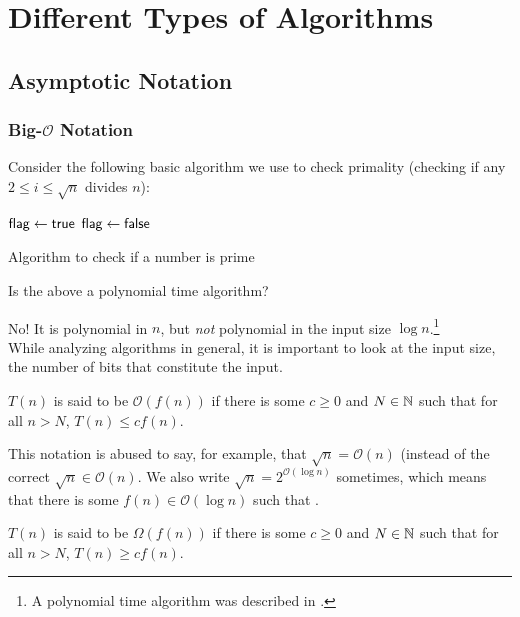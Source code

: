 \section{Different Types of Algorithms}

\subsection{Asymptotic Notation}

\subsubsection{Big-\texorpdfstring{$\mathcal{O}$}{} Notation}

Consider the following basic algorithm we use to check primality (checking if any $2\leq i\leq \sqrt{n}$ divides $n$):

\begin{algorithm}
	\DontPrintSemicolon
	$\mathsf{flag}\gets\mathsf{true}$\;
	 {
		 {
			$\mathsf{flag}\gets\mathsf{false}$
		}
	}
	\caption{Algorithm to check if a number is prime}
\end{algorithm}

Is the above a polynomial time algorithm?

No! It is polynomial in $n$, but \textit{not} polynomial in the input size $\log n$.\footnote{A polynomial time algorithm was described in \cite{AKS-primality}.}\\
While analyzing algorithms in general, it is important to look at the input size, the number of bits that constitute the input.

\begin{definition}
$T(n)$ is said to be $\mathcal{O}(f(n))$ if there is some $c\geq 0$ and $N\in\mathbb{N}$ such that for all $n>N$, $T(n)\leq cf(n)$.
\end{definition}

This notation is abused to say, for example, that $\sqrt{n} = \mathcal{O}(n)$ (instead of the correct $\sqrt{n}\in\mathcal{O}(n)$. We also write $\sqrt{n} = 2^{\mathcal{O}(\log n)}$ sometimes, which means that there is some $f(n)\in\mathcal{O}(\log n)$ such that .

\begin{definition}
$T(n)$ is said to be $\Omega(f(n))$ if there is some $c\geq 0$ and $N\in\mathbb{N}$ such that for all $n>N$, $T(n)\geq cf(n)$.
\end{definition}

